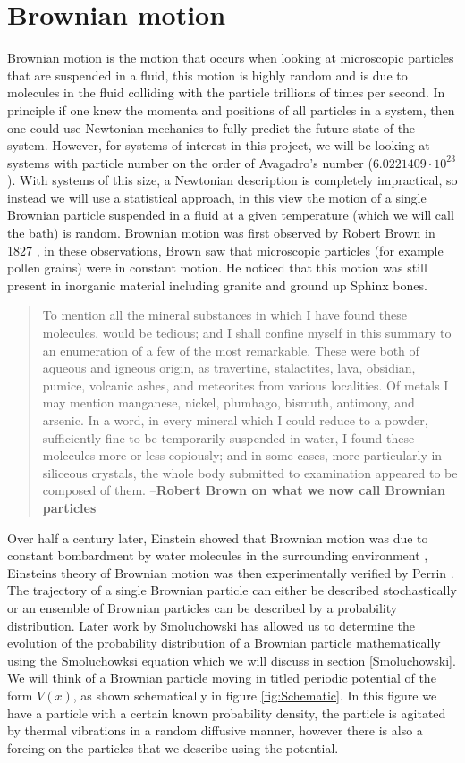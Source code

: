 \section{Brownian motion}
Brownian motion is the motion that occurs when looking at microscopic particles that are suspended in a fluid, this motion is highly random and is due to molecules in the fluid colliding with the particle trillions of times per second. In principle if one knew the momenta and positions of all particles in a system, then one could use Newtonian mechanics to fully predict the future state of the system. However, for systems of interest in this project, we will be looking at systems with particle number on the order of Avagadro's number ($6.0221409 \cdot 10^{23}$). With systems of this size, a Newtonian description is completely impractical, so instead we will use a statistical approach, in this view the motion of a single Brownian particle suspended in a fluid at a given temperature (which we will call the bath) is random.
Brownian motion was first observed by Robert Brown in 1827 \cite{Brown1828}, in these observations, Brown saw that microscopic particles (for example pollen grains) were in constant motion. He noticed that this motion was still present in inorganic material including granite and ground up Sphinx bones. 
\begin{quote}
To mention all the mineral substances in which I have found these molecules, would be tedious; and I shall confine myself in this summary to an enumeration of a few of the most remarkable. These were both of aqueous and igneous origin, as travertine, stalactites, lava, obsidian, pumice, volcanic ashes, and meteorites from various localities. Of metals I may mention manganese, nickel, plumhago, bismuth, antimony, and arsenic. In a word, in every mineral which I could reduce to a powder, sufficiently fine to be temporarily suspended in water, I found these molecules more or less copiously; and in some cases, more particularly in siliceous crystals, the whole body submitted to examination appeared to be composed of them. --\textbf{Robert Brown on what we now call Brownian particles}
\end{quote}
Over half a century later, Einstein showed that Brownian motion was due to constant bombardment by water molecules in the surrounding environment \cite{Einstein1905}, Einsteins theory of Brownian motion was then experimentally verified by Perrin \cite{Perrin2013}. The trajectory of a single Brownian particle can either be described stochastically or an ensemble of Brownian particles can be described by a probability distribution. Later work by Smoluchowski has allowed us to determine the evolution of the probability distribution of a Brownian particle mathematically using the Smoluchowksi equation which we will discuss in section \ref{Smoluchowski}.  We will think of a Brownian particle moving in titled periodic potential of the form $V(x)$, as shown schematically in figure \ref{fig:Schematic}. In this figure we have a particle with a certain known probability density, the particle is agitated by thermal vibrations in a random diffusive manner, however there is also a forcing on the particles that we describe using the potential.

